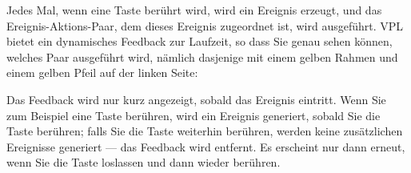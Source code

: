 Jedes Mal, wenn eine Taste berührt wird, wird ein Ereignis erzeugt, und das Ereignis-Aktions-Paar, dem dieses Ereignis zugeordnet ist, wird ausgeführt. VPL bietet ein dynamisches Feedback zur Laufzeit, so dass Sie genau sehen können, welches Paar ausgeführt wird, nämlich dasjenige mit einem gelben Rahmen und einem gelben Pfeil auf der linken Seite:


Das Feedback wird nur kurz angezeigt, sobald das Ereignis eintritt. Wenn Sie zum Beispiel eine Taste berühren, wird ein Ereignis generiert, sobald Sie die Taste berühren; falls Sie die Taste weiterhin berühren, werden keine zusätzlichen Ereignisse generiert --- das Feedback wird entfernt. Es erscheint nur dann erneut, wenn Sie die Taste loslassen und dann wieder berühren.
